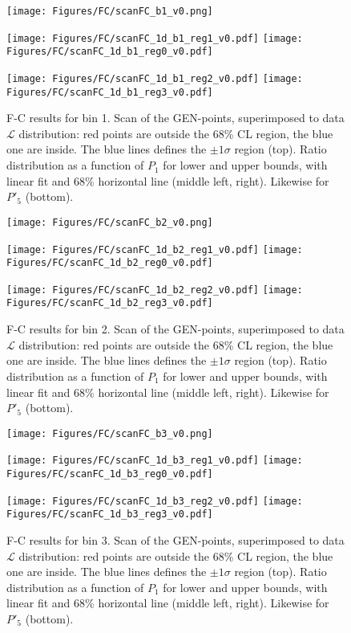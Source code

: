 \begin{figure}
  \centering
  \texttt{[image: Figures/FC/scanFC\_b1\_v0.png]}

  \texttt{[image: Figures/FC/scanFC\_1d\_b1\_reg1\_v0.pdf]}
  \texttt{[image: Figures/FC/scanFC\_1d\_b1\_reg0\_v0.pdf]}

  \texttt{[image: Figures/FC/scanFC\_1d\_b1\_reg2\_v0.pdf]}
  \texttt{[image: Figures/FC/scanFC\_1d\_b1\_reg3\_v0.pdf]}

  \caption{F-C results for bin 1.
    Scan of the GEN-points, superimposed to data $\mathcal{L}$ distribution: red points are outside the 68\% CL region, the blue one are inside.
    The blue lines defines the $\pm1\sigma$ region (top).
    Ratio distribution as a function of $P_1$ for lower and upper bounds, with linear fit and 68\% horizontal line (middle left, right).
    Likewise for $P'_5$ (bottom).}
  \label{fig:FC1}
\end{figure}

\begin{figure}
  \centering
  \texttt{[image: Figures/FC/scanFC\_b2\_v0.png]}

  \texttt{[image: Figures/FC/scanFC\_1d\_b2\_reg1\_v0.pdf]}
  \texttt{[image: Figures/FC/scanFC\_1d\_b2\_reg0\_v0.pdf]}

  \texttt{[image: Figures/FC/scanFC\_1d\_b2\_reg2\_v0.pdf]}
  \texttt{[image: Figures/FC/scanFC\_1d\_b2\_reg3\_v0.pdf]}

  \caption{F-C results for bin 2.
    Scan of the GEN-points, superimposed to data $\mathcal{L}$ distribution: red points are outside the 68\% CL region, the blue one are inside.
    The blue lines defines the $\pm1\sigma$ region (top).
    Ratio distribution as a function of $P_1$ for lower and upper bounds, with linear fit and 68\% horizontal line (middle left, right).
    Likewise for $P'_5$ (bottom).}
  \label{fig:FC2}
\end{figure}

\begin{figure}
  \centering
  \texttt{[image: Figures/FC/scanFC\_b3\_v0.png]}

  \texttt{[image: Figures/FC/scanFC\_1d\_b3\_reg1\_v0.pdf]}
  \texttt{[image: Figures/FC/scanFC\_1d\_b3\_reg0\_v0.pdf]}

  \texttt{[image: Figures/FC/scanFC\_1d\_b3\_reg2\_v0.pdf]}
  \texttt{[image: Figures/FC/scanFC\_1d\_b3\_reg3\_v0.pdf]}

  \caption{F-C results for bin 3.
    Scan of the GEN-points, superimposed to data $\mathcal{L}$ distribution: red points are outside the 68\% CL region, the blue one are inside.
    The blue lines defines the $\pm1\sigma$ region (top).
    Ratio distribution as a function of $P_1$ for lower and upper bounds, with linear fit and 68\% horizontal line (middle left, right).
    Likewise for $P'_5$ (bottom).}
  \label{fig:FC3}
\end{figure}

